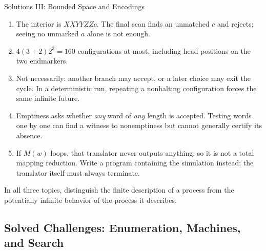 \documentclass[10pt]{beamer}
\begin{document}
\begin{frame}{Solutions III: Bounded Space and Encodings}
  \small
  \begin{enumerate}
    \item The interior is $XXYYZZc$. The final scan finds an unmatched
      $c$ and rejects; seeing no unmarked $a$ alone is not enough.
    \item $4(3+2)2^3=160$ configurations at most, including head positions
      on the two endmarkers.
    \item Not necessarily: another branch may accept, or a later choice
      may exit the cycle. In a deterministic run, repeating a nonhalting
      configuration forces the same infinite future.
    \item Emptiness asks whether \emph{any} word of \emph{any} length
      is accepted. Testing words one by one can find a witness to
      nonemptiness but cannot generally certify its absence.
    \item If $M(w)$ loops, that translator never outputs anything, so it
      is not a total mapping reduction. Write a program containing the
      simulation instead; the translator itself must always terminate.
  \end{enumerate}
  In all three topics, distinguish the finite description of a process
  from the potentially infinite behavior of the process it describes.
\end{frame}

\subsection{Solved Challenges: Enumeration, Machines, and Search}
\end{document}
